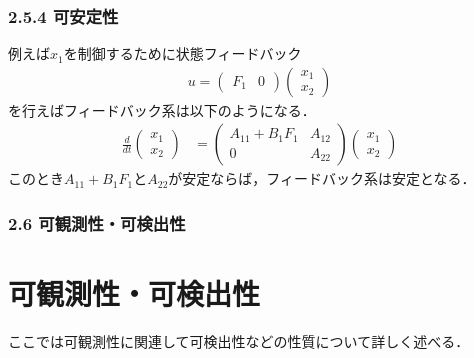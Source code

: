 \begin{frame}[t]
\frametitle{2.5.4 可安定性}
例えば$x_1$を制御するために状態フィードバック
\begin{align}
	u = \left(
		\begin{array}{cc}
			F_1 & 0 
		\end{array}
	    \right)
	    \left(
		\begin{array}{c}
			x_1 \\
			x_2 
		\end{array}
	    \right)
\end{align}
を行えばフィードバック系は以下のようになる．
\begin{align}
 \frac{d}{dt}
  \left(\begin{array}{c}
         {x}_1 \\
	 {x}_2 
	\end{array}\right)
  &=
  \left(\begin{array}{cc}
         {A}_{11}+B_1 F_1 & {A}_{12} \\
	     0        & {A}_{22}
	\end{array}\right)
  \left(\begin{array}{c}
         {x}_1 \\
	 {x}_2 
	\end{array}\right)
\end{align}
このとき${A}_{11}+B_1 F_1$と${A}_{22}$が安定ならば，フィードバック系は安定となる．

\end{frame}


\begin{frame}[t]
\frametitle{2.6 可観測性・可検出性}

\section{可観測性・可検出性}

ここでは可観測性に関連して可検出性などの性質について詳しく述べる．

\end{frame}

